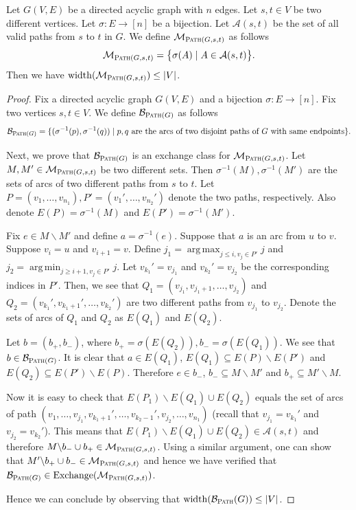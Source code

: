 \documentclass{article}
\newcommand{\M}{\mathcal M}
\newcommand{\B}{\mathcal B}
\newcommand{\del}{\backslash}
\DeclareMathOperator{\rank}{width}
\DeclareMathOperator*{\argmax}{arg\,max}
\DeclareMathOperator*{\argmin}{arg\,min}
\DeclareMathOperator{\Exchange}{Exchange}
\newcommand{\Path}{\textsc{Path}\xspace}
\begin{document}
\begin{fact}[Path]
\label{fact:path}
Let $G(V,E)$ be a directed acyclic graph with $n$ edges.
Let $s,t\in V$ be two different vertices.
Let $\sigma\colon E\rightarrow [n]$ be a bijection.
Let $\mathcal A(s,t)$ be the set of all valid paths from $s$ to $t$ in $G$. 
We define $\M_{\Path(G,s,t)}$ as follows
$$
\M_{\Path(G,s,t)} = \big\{\sigma(A) \mid A\in\mathcal A(s,t) \big\}.
$$
Then we have $\rank(\M_{\Path(G,s,t)}) \le |V|$. 
\end{fact}

\begin{proof}
Fix  a directed acyclic graph $G(V,E)$ and a bijection $\sigma\colon E\rightarrow [n]$. 
Fix two vertices $s,t\in V$.
We define $\B_{\Path(G)}$ as follows
$$
\B_{\Path(G)} = \{(\sigma^{-1}(p), \sigma^{-1}(q)) \mid p,q \text{ are the arcs of two disjoint paths of }G\text{ with same endpoints}\}.
$$

Next, we prove that $\B_{\Path(G)}$ is an exchange class for $\M_{\Path(G,s,t)}$.
Let $M,M' \in \M_{\Path(G,s,t)}$ be two different sets. 
Then $\sigma^{-1}(M),\sigma^{-1}(M')$ are the sets of arcs of two different paths from $s$ to $t$.
Let $P=(v_1,\ldots,v_{n_1}),P'=(v_1',\ldots,v_{n_2}')$ denote the two paths, respectively. 
Also denote $E(P) = \sigma^{-1}(M)$ and $E(P') = \sigma^{-1}(M')$.


Fix $e\in M\del M'$ and define $a=\sigma^{-1}(e)$.
Suppose that $a$ is an arc from $u$ to $v$.
Suppose $v_i=u$ and $v_{i+1} = v$.
Define $j_1 = \argmax_{j \le i, v_j\in P'} j$ and $j_2 = \argmin_{j \ge i+1, v_j \in P'} j$.
Let $v_{k_1}' = v_{j_1}$ and $v_{k_2}'= v_{j_2}$ be the corresponding indices in $P'$.
Then, we see that $Q_1=(v_{j_1},v_{j_1+1},\ldots,v_{j_2})$ and $Q_2= (v_{k_1}',v_{k_1+1}', \ldots,v_{k_2}')$ are two different paths from $v_{j_1}$ to $v_{j_2}$. 
Denote the sets of arcs of $Q_1$ and $Q_2$ as $E(Q_1)$ and $E(Q_2)$. 

Let $b=(b_+,b_-)$, where $b_+=\sigma(E(Q_2)), b_-=\sigma(E(Q_1))$. We see that $b \in \B_{\Path(G)}$.
It is clear that $a\in E(Q_1)$, $E(Q_1) \subseteq E(P) \del E(P')$ and $E(Q_2) \subseteq E(P') \del E(P)$. 
Therefore $e\in b_-$, $b_-\subseteq M\del M'$ and $b_+\subseteq M'\del M$.

Now it is easy to check that $E(P_1)\del E(Q_1) \cup E(Q_2)$ equals the set of arcs of path $(v_1,\ldots, v_{j_1}, v_{k_1+1}',\ldots, v_{k_2-1}', v_{j_2},\ldots, v_{n_1})$ (recall that $v_{j_1}=v_{k_1}'$ and $v_{j_2}=v_{k_2}'$).
This means that $E(P_1)\del E(Q_1)\cup E(Q_2) \in \mathcal A(s,t)$ and therefore $M\del b_-\cup b_+ \in \M_{\Path(G,s,t)}$.
Using a similar argument, one can show that $M'\del b_+\cup b_- \in \M_{\Path(G,s,t)}$ and hence we have verified that 
$\B_{\Path(G)}\in\Exchange(\M_{\Path(G,s,t)})$.

Hence we can conclude by observing that $\rank(\B_\Path(G)) \le |V|$.
\end{proof}
\end{document}
